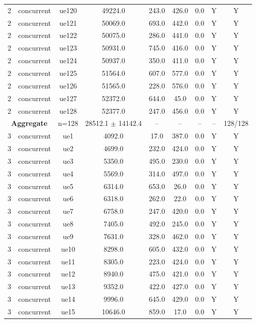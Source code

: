 \begin{table}[ht]
\begin{tabular}{|c|c|c|c|c|c|c|c|c|}
2 & concurrent & ue120 & 49224.0 & 243.0 & 426.0 & 0.0 & Y & Y \\
2 & concurrent & ue121 & 50069.0 & 693.0 & 442.0 & 0.0 & Y & Y \\
2 & concurrent & ue122 & 50075.0 & 286.0 & 441.0 & 0.0 & Y & Y \\
2 & concurrent & ue123 & 50931.0 & 745.0 & 416.0 & 0.0 & Y & Y \\
2 & concurrent & ue124 & 50937.0 & 350.0 & 411.0 & 0.0 & Y & Y \\
2 & concurrent & ue125 & 51564.0 & 607.0 & 577.0 & 0.0 & Y & Y \\
2 & concurrent & ue126 & 51565.0 & 228.0 & 576.0 & 0.0 & Y & Y \\
2 & concurrent & ue127 & 52372.0 & 644.0 & 45.0 & 0.0 & Y & Y \\
2 & concurrent & ue128 & 52377.0 & 247.0 & 456.0 & 0.0 & Y & Y \\
\multicolumn{2}{|c|}{\textbf{Aggregate}} & n=128 & 28512.1 $\pm$ 14142.4 & -- & -- & -- & -- & 128/128 \\
\hline
3 & concurrent & ue1 & 4092.0 & 17.0 & 387.0 & 0.0 & Y & Y \\
3 & concurrent & ue2 & 4699.0 & 232.0 & 424.0 & 0.0 & Y & Y \\
3 & concurrent & ue3 & 5350.0 & 495.0 & 230.0 & 0.0 & Y & Y \\
3 & concurrent & ue4 & 5569.0 & 314.0 & 497.0 & 0.0 & Y & Y \\
3 & concurrent & ue5 & 6314.0 & 653.0 & 26.0 & 0.0 & Y & Y \\
3 & concurrent & ue6 & 6318.0 & 262.0 & 22.0 & 0.0 & Y & Y \\
3 & concurrent & ue7 & 6758.0 & 247.0 & 420.0 & 0.0 & Y & Y \\
3 & concurrent & ue8 & 7405.0 & 492.0 & 245.0 & 0.0 & Y & Y \\
3 & concurrent & ue9 & 7631.0 & 328.0 & 462.0 & 0.0 & Y & Y \\
3 & concurrent & ue10 & 8298.0 & 605.0 & 432.0 & 0.0 & Y & Y \\
3 & concurrent & ue11 & 8305.0 & 223.0 & 424.0 & 0.0 & Y & Y \\
3 & concurrent & ue12 & 8940.0 & 475.0 & 421.0 & 0.0 & Y & Y \\
3 & concurrent & ue13 & 9352.0 & 422.0 & 427.0 & 0.0 & Y & Y \\
3 & concurrent & ue14 & 9996.0 & 645.0 & 429.0 & 0.0 & Y & Y \\
3 & concurrent & ue15 & 10646.0 & 859.0 & 17.0 & 0.0 & Y & Y \\

\end{tabular}
\end{table}
